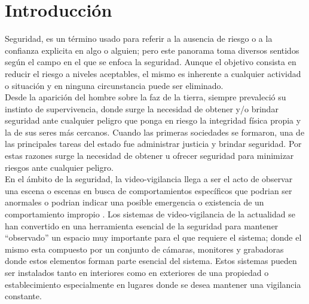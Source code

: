 \chapter{Introducción}

Seguridad, es un término usado para referir a la ausencia de riesgo o a la confianza explicita en algo o alguien; pero este panorama toma diversos sentidos según el campo en el que se enfoca la seguridad. Aunque el objetivo consista en reducir el riesgo a niveles aceptables, el mismo es inherente a cualquier actividad o situación y en ninguna circunstancia puede ser eliminado.\\

Desde la aparición del hombre sobre la faz de la tierra, siempre prevaleció su instinto de supervivencia, donde surge la necesidad de obtener y/o brindar seguridad ante cualquier peligro que ponga en riesgo la integridad física propia y la de sus seres más cercanos. Cuando las primeras sociedades se formaron, una de las principales tareas del estado fue administrar justicia y brindar seguridad. Por estas razones surge la necesidad de obtener u ofrecer seguridad para minimizar riesgos ante cualquier peligro.\\

En el ámbito de la seguridad, la video-vigilancia llega a ser el acto de observar una escena o escenas en busca de comportamientos específicos que podrian ser anormales o podrian indicar una posible emergencia o existencia de un comportamiento impropio \cite{NORMAN:201795}. Los sistemas de video-vigilancia de la actualidad se han convertido en una herramienta esencial de la seguridad para mantener ``observado'' un espacio muy importante para el que requiere el sistema; donde el mismo esta compuesto por un conjunto de cámaras, monitores y grabadoras donde estos elementos forman parte esencial del sistema. Estos sistemas pueden ser instalados tanto en interiores como en exteriores de una propiedad o establecimiento especialmente en lugares donde se desea mantener una vigilancia constante.\\

